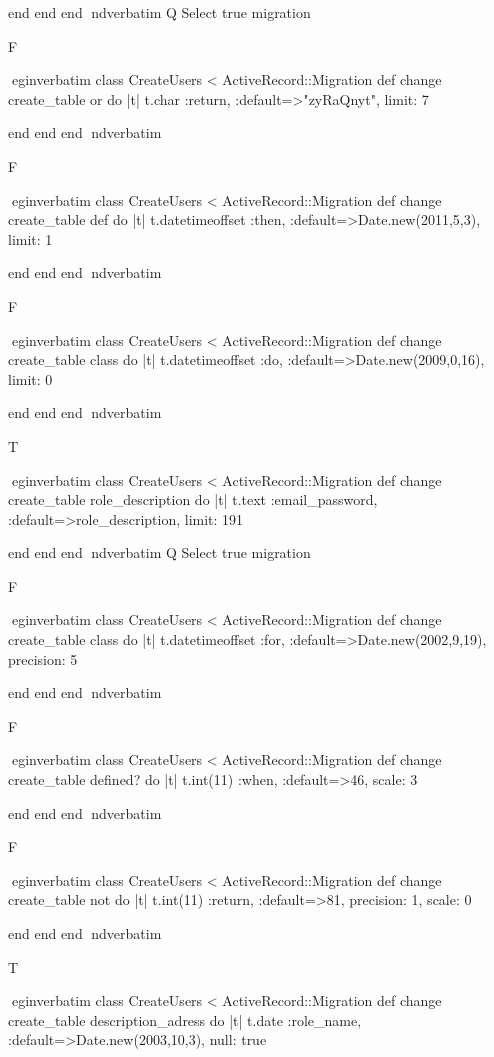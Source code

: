     end 
  end 
end
nd{verbatim}
Q
 Select true migration

F

egin{verbatim}
 class CreateUsers < ActiveRecord::Migration 
  def change 
    create_table or do |t| 
      t.char :return, :default=>"zyRaQnyt", limit: 7
    
    end 
  end 
end
nd{verbatim}

F

egin{verbatim}
 class CreateUsers < ActiveRecord::Migration 
  def change 
    create_table def do |t| 
      t.datetimeoffset :then, :default=>Date.new(2011,5,3), limit: 1
    
    end 
  end 
end
nd{verbatim}

F

egin{verbatim}
 class CreateUsers < ActiveRecord::Migration 
  def change 
    create_table class do |t| 
      t.datetimeoffset :do, :default=>Date.new(2009,0,16), limit: 0
    
    end 
  end 
end
nd{verbatim}

T

egin{verbatim}
 class CreateUsers < ActiveRecord::Migration 
  def change 
    create_table role_description do |t| 
      t.text :email_password, :default=>role_description, limit: 191
    
    end 
  end 
end
nd{verbatim}
Q
 Select true migration

F

egin{verbatim}
 class CreateUsers < ActiveRecord::Migration 
  def change 
    create_table class do |t| 
      t.datetimeoffset :for, :default=>Date.new(2002,9,19), precision: 5
    
    end 
  end 
end
nd{verbatim}

F

egin{verbatim}
 class CreateUsers < ActiveRecord::Migration 
  def change 
    create_table defined? do |t| 
      t.int(11) :when, :default=>46, scale: 3
    
    end 
  end 
end
nd{verbatim}

F

egin{verbatim}
 class CreateUsers < ActiveRecord::Migration 
  def change 
    create_table not do |t| 
      t.int(11) :return, :default=>81, precision: 1, scale: 0
    
    end 
  end 
end
nd{verbatim}

T

egin{verbatim}
 class CreateUsers < ActiveRecord::Migration 
  def change 
    create_table description_adress do |t| 
      t.date :role_name, :default=>Date.new(2003,10,3), null: true
    
